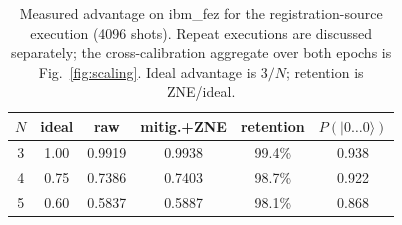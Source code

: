 \documentclass[conference]{IEEEtran}
\newcommand{\ket}[1]{\ensuremath{|#1\rangle}}
\begin{document}
\begin{table}[t]
\centering
\caption{Measured advantage on ibm\_fez for the registration-source execution
(4096 shots). Repeat executions are discussed separately; the cross-calibration
aggregate over both epochs is Fig.~\ref{fig:scaling}. Ideal advantage is $3/N$;
retention is ZNE/ideal.}
\label{tab:scaling}
\begin{tabular}{@{}ccccc c@{}}
\toprule
$N$ & ideal & raw & mitig.+ZNE & retention & $P(\ket{0\ldots0})$\\
\midrule
3 & 1.00 & 0.9919 & 0.9938 & 99.4\% & 0.938\\
4 & 0.75 & 0.7386 & 0.7403 & 98.7\% & 0.922\\
5 & 0.60 & 0.5837 & 0.5887 & 98.1\% & 0.868\\
\bottomrule
\end{tabular}
\end{table}
\end{document}
